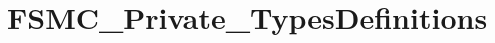\hypertarget{group___f_s_m_c___private___types_definitions}{}\section{F\+S\+M\+C\+\_\+\+Private\+\_\+\+Types\+Definitions}
\label{group___f_s_m_c___private___types_definitions}
